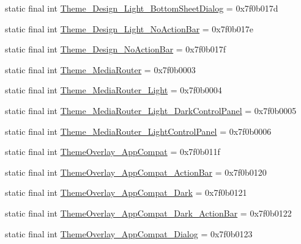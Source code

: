 \begin{CompactItemize}
\item 
static final int \hyperlink{classandroid_1_1support_1_1graphics_1_1drawable_1_1_r_1_1style_8904ec641874ca22c88717097632b8fb}{Theme\_\-Design\_\-Light\_\-BottomSheetDialog} = 0x7f0b017d
\item 
static final int \hyperlink{classandroid_1_1support_1_1graphics_1_1drawable_1_1_r_1_1style_57f51b18869e8812d39b458873f4c468}{Theme\_\-Design\_\-Light\_\-NoActionBar} = 0x7f0b017e
\item 
static final int \hyperlink{classandroid_1_1support_1_1graphics_1_1drawable_1_1_r_1_1style_74a551737cc8524e9e20a0c6c02ff20e}{Theme\_\-Design\_\-NoActionBar} = 0x7f0b017f
\item 
static final int \hyperlink{classandroid_1_1support_1_1graphics_1_1drawable_1_1_r_1_1style_07c811123c73b0272b707668e547fde6}{Theme\_\-MediaRouter} = 0x7f0b0003
\item 
static final int \hyperlink{classandroid_1_1support_1_1graphics_1_1drawable_1_1_r_1_1style_1f09534b55fca494a692721d27da6e3e}{Theme\_\-MediaRouter\_\-Light} = 0x7f0b0004
\item 
static final int \hyperlink{classandroid_1_1support_1_1graphics_1_1drawable_1_1_r_1_1style_b3065aee676f51be8a9fc6e27fa201be}{Theme\_\-MediaRouter\_\-Light\_\-DarkControlPanel} = 0x7f0b0005
\item 
static final int \hyperlink{classandroid_1_1support_1_1graphics_1_1drawable_1_1_r_1_1style_cd63ade73df8bd4cd477cec4adab7e9f}{Theme\_\-MediaRouter\_\-LightControlPanel} = 0x7f0b0006
\item 
static final int \hyperlink{classandroid_1_1support_1_1graphics_1_1drawable_1_1_r_1_1style_cd3744e2d3ba0515121e9bd6a4d2e462}{ThemeOverlay\_\-AppCompat} = 0x7f0b011f
\item 
static final int \hyperlink{classandroid_1_1support_1_1graphics_1_1drawable_1_1_r_1_1style_ef90b9b1ff9fe857ca36801a09bdc844}{ThemeOverlay\_\-AppCompat\_\-ActionBar} = 0x7f0b0120
\item 
static final int \hyperlink{classandroid_1_1support_1_1graphics_1_1drawable_1_1_r_1_1style_52066542f543e2c736ecfa67e4aa0da5}{ThemeOverlay\_\-AppCompat\_\-Dark} = 0x7f0b0121
\item 
static final int \hyperlink{classandroid_1_1support_1_1graphics_1_1drawable_1_1_r_1_1style_28e05210673de7c38d05f7b1465710af}{ThemeOverlay\_\-AppCompat\_\-Dark\_\-ActionBar} = 0x7f0b0122
\item 
static final int \hyperlink{classandroid_1_1support_1_1graphics_1_1drawable_1_1_r_1_1style_7d9cf6c6cf65f27024dbd662cf522e21}{ThemeOverlay\_\-AppCompat\_\-Dialog} = 0x7f0b0123

\end{CompactItemize}
